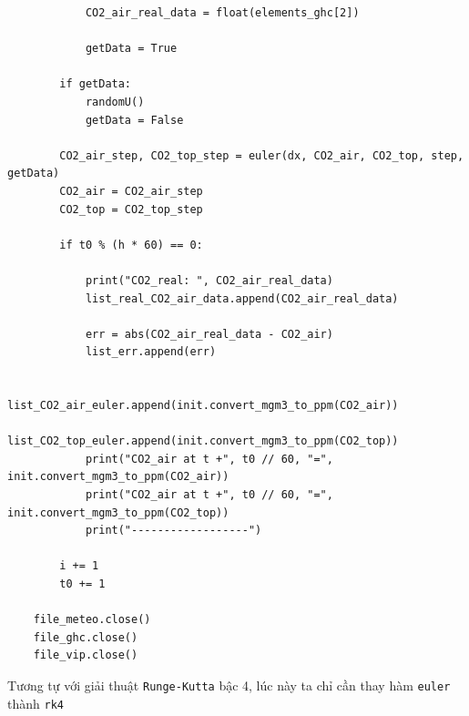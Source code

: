 \documentclass[a4paper]{article}
\begin{document}
\begin{verbatim}
            CO2_air_real_data = float(elements_ghc[2])

            getData = True

        if getData:
            randomU()
            getData = False

        CO2_air_step, CO2_top_step = euler(dx, CO2_air, CO2_top, step, getData)
        CO2_air = CO2_air_step
        CO2_top = CO2_top_step

        if t0 % (h * 60) == 0:

            print("CO2_real: ", CO2_air_real_data)
            list_real_CO2_air_data.append(CO2_air_real_data)

            err = abs(CO2_air_real_data - CO2_air)
            list_err.append(err)
            
            list_CO2_air_euler.append(init.convert_mgm3_to_ppm(CO2_air))
            list_CO2_top_euler.append(init.convert_mgm3_to_ppm(CO2_top))
            print("CO2_air at t +", t0 // 60, "=", init.convert_mgm3_to_ppm(CO2_air))
            print("CO2_air at t +", t0 // 60, "=", init.convert_mgm3_to_ppm(CO2_top))
            print("------------------")

        i += 1
        t0 += 1

    file_meteo.close()
    file_ghc.close()
    file_vip.close()
\end{verbatim}

Tương tự với giải thuật \texttt{Runge-Kutta} bậc 4, lúc này ta chỉ cần thay hàm \texttt{euler} thành \texttt{rk4}
\end{document}
